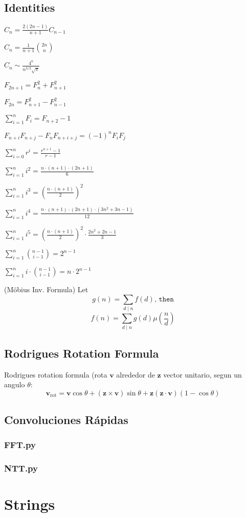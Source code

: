 \documentclass{article}
\newcommand\codefile[2]{    
    \subsubsection{#2}
    
    
}
\begin{document}
\begin{multicols*}{2}
\subsection{Identities}
    $C_n = \frac{2(2n-1)}{n+1} C_{n-1}$

    $C_n = \frac{1}{n+1} \binom{2n}{n}$

    $C_n \sim \frac{4^n}{n^{3/2}\sqrt{\pi}}$

    $F_{2n+1} = F_{n}^2 + F_{n+1}^2$

    $F_{2n} = F_{n+1}^2 - F_{n-1}^2$

    $\sum_{i=1}^n F_i = F_{n+2}-1$

    $F_{n+i}F_{n+j} - F_nF_{n+i+j} = (-1)^n F_iF_j$

    $\sum_{i=0}^n{r^i} = \frac{r^{n+1}-1}{r-1}$
    
    $\sum_{i=1}^n{i^2} = \frac{n\cdot(n+1)\cdot(2n+1)}{6}$

    $\sum_{i=1}^n{i^3} = \left(\frac{n\cdot(n+1)}{2}\right)^2$

    $\sum_{i=1}^n{i^4} = \frac{n\cdot(n+1)\cdot(2n+1)\cdot(3n^2+3n-1)}{12}$

    $\sum_{i=1}^{ n} i^5 = \left(\frac{ n \cdot (n+1)}{2}\right) ^2 \cdot \frac{2 n ^2 + 2n - 1}{3}$

    $\sum_{i=1}^n{\binom{n-1}{i-1}} = 2^{n-1}$

    $\sum_{i=1}^n{i\cdot\binom{n-1}{i-1}} = n\cdot2^{n-1}$

    (Möbius Inv. Formula)
    Let
    \[g(n) = \sum_{d\mid n} f(d) \texttt{, then}\]
    \[f(n)=\sum_{d\mid n} g(d) \mu\left(\frac{n}{d}\right)\]


\subsection{Rodrigues Rotation Formula}
Rodrigues rotation formula (rota $\mathbf{v}$ alrededor de $\mathbf{z}$ vector unitario, segun un angulo $\theta$:
$$\mathbf{v}_\mathrm{rot} = \mathbf{v} \cos\theta + (\mathbf{z} \times \mathbf{v})\sin\theta   + \mathbf{z} (\mathbf{z} \cdot \mathbf{v}) (1 - \cos\theta)$$


\subsection{Convoluciones Rápidas}
\codefile{matematicas/FFT.py}{FFT.py}
\codefile{matematicas/NTT.py}{NTT.py}

\section{Strings}


\end{multicols*}
\end{document}
